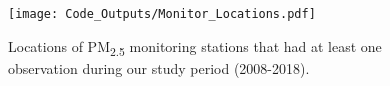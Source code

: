 
\begin{figure} 
\centering  
\texttt{[image: Code\_Outputs/Monitor\_Locations.pdf]} 
\caption{\label{fig:MonitorLocations}Locations of PM\textsubscript{2.5} monitoring stations that had at least one observation during our study period (2008-2018).} 
\end{figure} 
 
